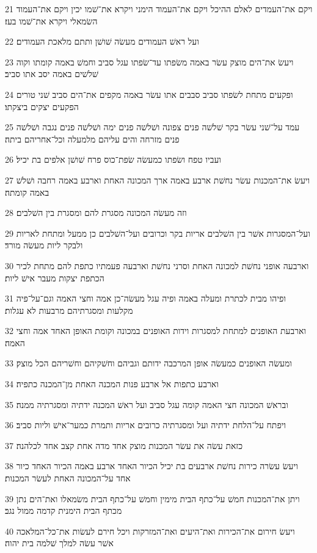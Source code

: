 \par 21 ויקם את־העמדים לאלם ההיכל ויקם את־העמוד הימני ויקרא את־שׁמו יכין ויקם את־העמוד השׂמאלי ויקרא את־שׁמו בעז׃
\par 22 ועל ראשׁ העמודים מעשׂה שׁושׁן ותתם מלאכת העמודים׃
\par 23 ויעשׂ את־הים מוצק עשׂר באמה משׂפתו עד־שׂפתו עגל סביב וחמשׁ באמה קומתו וקוה שׁלשׁים באמה יסב אתו סביב׃
\par 24 ופקעים מתחת לשׂפתו סביב סבבים אתו עשׂר באמה מקפים את־הים סביב שׁני טורים הפקעים יצקים ביצקתו׃
\par 25 עמד על־שׁני עשׂר בקר שׁלשׁה פנים צפונה ושׁלשׁה פנים ימה ושׁלשׁה פנים נגבה ושׁלשׁה פנים מזרחה והים עליהם מלמעלה וכל־אחריהם ביתה׃
\par 26 ועביו טפח ושׂפתו כמעשׂה שׂפת־כוס פרח שׁושׁן אלפים בת יכיל׃
\par 27 ויעשׂ את־המכנות עשׂר נחשׁת ארבע באמה ארך המכונה האחת וארבע באמה רחבה ושׁלשׁ באמה קומתה׃
\par 28 וזה מעשׂה המכונה מסגרת להם ומסגרת בין השׁלבים׃
\par 29 ועל־המסגרות אשׁר בין השׁלבים אריות בקר וכרובים ועל־השׁלבים כן ממעל ומתחת לאריות ולבקר ליות מעשׂה מורד׃
\par 30 וארבעה אופני נחשׁת למכונה האחת וסרני נחשׁת וארבעה פעמתיו כתפת להם מתחת לכיר הכתפת יצקות מעבר אישׁ ליות׃
\par 31 ופיהו מבית לכתרת ומעלה באמה ופיה עגל מעשׂה־כן אמה וחצי האמה וגם־על־פיה מקלעות ומסגרתיהם מרבעות לא עגלות׃
\par 32 וארבעת האופנים למתחת למסגרות וידות האופנים במכונה וקומת האופן האחד אמה וחצי האמה׃
\par 33 ומעשׂה האופנים כמעשׂה אופן המרכבה ידותם וגביהם וחשׁקיהם וחשׁריהם הכל מוצק׃
\par 34 וארבע כתפות אל ארבע פנות המכנה האחת מן־המכנה כתפיה׃
\par 35 ובראשׁ המכונה חצי האמה קומה עגל סביב ועל ראשׁ המכנה ידתיה ומסגרתיה ממנה׃
\par 36 ויפתח על־הלחת ידתיה ועל ומסגרתיה כרובים אריות ותמרת כמער־אישׁ וליות סביב׃
\par 37 כזאת עשׂה את עשׂר המכנות מוצק אחד מדה אחת קצב אחד לכלהנה׃
\par 38 ויעשׂ עשׂרה כירות נחשׁת ארבעים בת יכיל הכיור האחד ארבע באמה הכיור האחד כיור אחד על־המכונה האחת לעשׂר המכנות׃
\par 39 ויתן את־המכנות חמשׁ על־כתף הבית מימין וחמשׁ על־כתף הבית משׂמאלו ואת־הים נתן מכתף הבית הימנית קדמה ממול נגב׃
\par 40 ויעשׂ חירום את־הכירות ואת־היעים ואת־המזרקות ויכל חירם לעשׂות את־כל־המלאכה אשׁר עשׂה למלך שׁלמה בית יהוה׃
